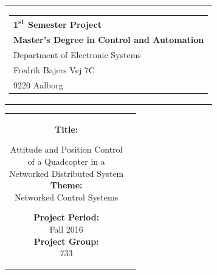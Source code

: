 % 
\begin{nopagebreak}
{\samepage 

\begin{tabular}{r}
\parbox{\textwidth}{  
\hfill \hspace{2cm} \parbox{8cm}{\begin{tabular}{l} %
{\small \textbf{\textcolor{aaublue}{\colorbox{white}{1\textsuperscript{st} Semester Project}}}}\\
{\small \textbf{\textcolor{aaublue}{Master's Degree in Control and Automation}}}\\ 
{\small \textcolor{aaublue}{Department of Electronic Systems}}\\
{\small \textcolor{aaublue}{Fredrik Bajers Vej 7C}} \\
{\small \textcolor{aaublue}{9220 Aalborg}} \\
\end{tabular}}}
\end{tabular}

\begin{tabular}{cc}
\parbox{7cm}{

\textbf{Title:}

Attitude and Position Control\\ of a Quadcopter in a \\Networked Distributed System \\

\textbf{Theme:} \\
\small{Networked Control Systems
\\
}


\parbox{8cm}{


\textbf{Project Period:}\\
Fall 2016\\
   
\textbf{Project Group:}\\
733\\ %
  
}}
\end{tabular}}
\end{nopagebreak}
